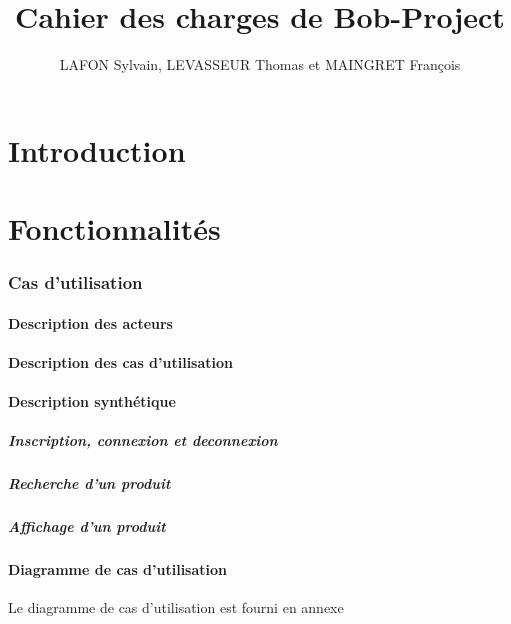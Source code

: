 \documentclass[10pt,a4paper]{article}
\title{Cahier des charges de Bob-Project}
\author{LAFON Sylvain, LEVASSEUR Thomas et MAINGRET François}
\begin{document}
	\maketitle
	\tableofcontents
	\newpage
	\part{Introduction}
		
	\newpage
	\part{Fonctionnalités}
		\section{Cas d'utilisation}
			\subsection{Description des acteurs}
				
			\subsection{Description des cas d'utilisation}
				
			\subsection{Description synthétique}
				\subsubsection{Inscription, connexion et deconnexion}
					
				\subsubsection{Recherche d'un produit}
					
				\subsubsection{Affichage d'un produit}
					
			\subsection{Diagramme de cas d'utilisation}
				Le diagramme de cas d'utilisation est fourni en annexe
				\newline
					
\end{document}
